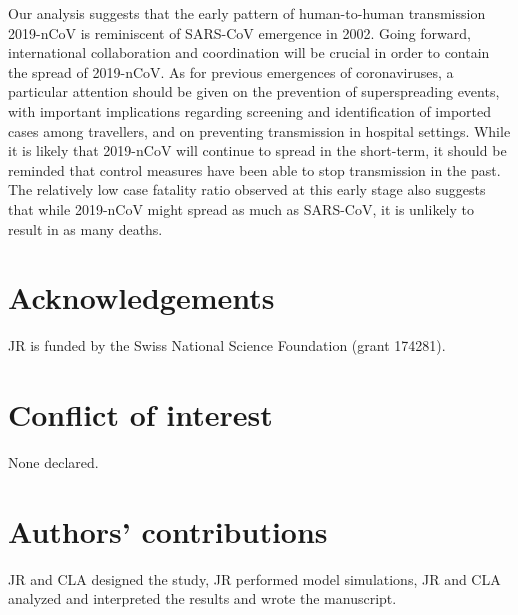 \documentclass{article}
\begin{document}
Our analysis suggests that the early pattern of human-to-human transmission 2019-nCoV is reminiscent of SARS-CoV emergence in 2002.
Going forward, international collaboration and coordination will be crucial in order to contain the spread of 2019-nCoV.
As for previous emergences of coronaviruses, a particular attention should be given on the prevention of superspreading events, with important implications regarding screening and identification of imported cases among travellers, and on preventing transmission in hospital settings.
While it is likely that 2019-nCoV will continue to spread in the short-term, it should be reminded that control measures have been able to stop transmission in the past.
The relatively low case fatality ratio observed at this early stage also suggests that while 2019-nCoV might spread as much as SARS-CoV, it is unlikely to result in as many deaths.


\section{Acknowledgements}
JR is funded by the Swiss National Science Foundation (grant 174281).
\section{Conflict of interest}
None declared.

\section{Authors' contributions}

JR and CLA designed the study, JR performed model simulations, JR and CLA analyzed and interpreted the results and wrote the manuscript.


  
\end{document}

